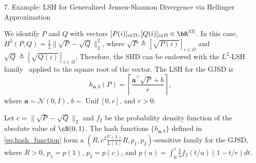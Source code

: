 \documentclass[final]{beamer}
\newlength{\threecolwid}
\begin{document}
\begin{frame}[t]
\begin{columns}[t]
\begin{column}{\threecolwid}
\begin{block}{7. Example: LSH for Generalized Jensen-Shannon 
			Divergence via Hellinger Approximation}
		
		We  
		identify $ P $ and $Q$ with vectors 
		$[P(i)]_{i\in 
			\Omega}, [Q(i)]_{i\in \Omega}\in \bR^{|\Omega|} $.
		In this case, 
		$
		H^2(P, Q) = \frac{1}{2} \| \sqrt{P}-\sqrt{Q} \|_2^2$, where $ 
		\sqrt{P} \triangleq [\sqrt{P(i)}]_{i\in \Omega} $ and $ \sqrt{Q} 
		\triangleq 
		[\sqrt{Q(i)}]_{i\in \Omega} $.
		Therefore, the SHD can be 
		endowed with the $ L^2 $-LSH family~\citep{datar2004locality} applied 
		to the 
		square root of the vector. 
		The LSH for the 
		GJSD is 
		\begin{equation}\label{eq:hash_function}
		h_{\mathbf{a}, b}(P) = \left\lceil  \frac{\mathbf{a}^\top \sqrt{P} +b 
		}{r} 
		\right\rceil,
		\end{equation}
		where $ \mathbf{a}\sim \mathcal{N}(0, I) $,
		$ b\sim \operatorname{Unif}[0, r] $,
		  and $ r>0 $.
		
			Let $ c= \| 
			\sqrt{P}-\sqrt{Q} \|_2$ and $ f_2 $ be the probability density 
			function of the 
			absolute value of $ \cN(0,1) $.	The hash 
			functions $ 
			\{h_{\mathbf{a},b}\}  $ defined in \eqref{eq:hash_function} form a 
			$ (R,c^2\frac{U(\lambda)}{L(\lambda)}R,p_1,p_2) 
			$-sensitive 
			family for the 
			GJSD,
			where $ R>0 
			$, $ p_1 = p(1) $, $ p_2=p(c) $, and $
			p(u) = \int_0^r \frac{1}{u}f_2(t/u)(1-t/r)dt$.
		

\end{block}
\end{column}
\end{columns}
\end{frame}
\end{document}
